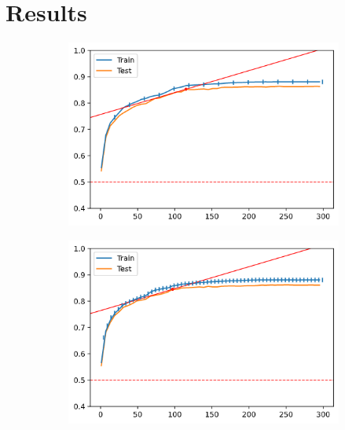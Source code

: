 \section{Results}

\begin{figure}[H]
    \centering
    \begin{subfigure}[b]{0.32\linewidth}
        \includegraphics[width=\linewidth]{img/300-s20.png}
    \end{subfigure}
    \begin{subfigure}[b]{0.32\linewidth}
        \includegraphics[width=\linewidth]{img/300-s5.png}
    \end{subfigure}
    \begin{subfigure}[b]{0.32\linewidth}

\end{subfigure}
\end{figure}

